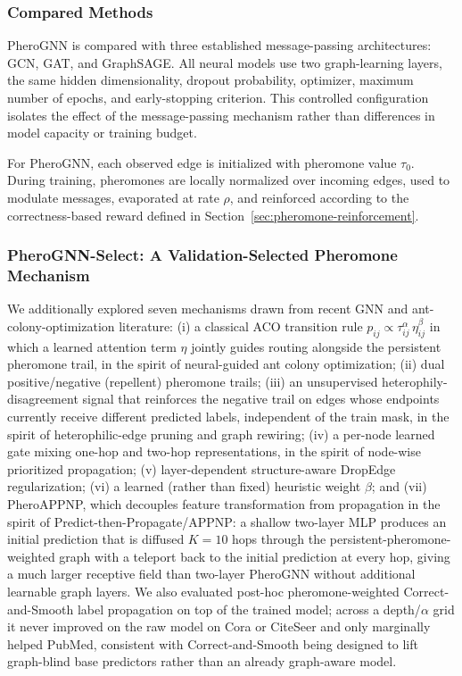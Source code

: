 \subsubsection{Compared Methods}

PheroGNN is compared with three established message-passing architectures: GCN, GAT, and GraphSAGE. All neural models use two graph-learning layers, the same hidden dimensionality, dropout probability, optimizer, maximum number of epochs, and early-stopping criterion. This controlled configuration isolates the effect of the message-passing mechanism rather than differences in model capacity or training budget.

For PheroGNN, each observed edge is initialized with pheromone value $\tau_0$. During training, pheromones are locally normalized over incoming edges, used to modulate messages, evaporated at rate $\rho$, and reinforced according to the correctness-based reward defined in Section~\ref{sec:pheromone-reinforcement}.

\subsubsection{PheroGNN-Select: A Validation-Selected Pheromone Mechanism}
\label{sec:pherognn-select}

We additionally explored seven mechanisms drawn from recent GNN and ant-colony-optimization literature: (i) a classical ACO transition rule $p_{ij} \propto \tau_{ij}^{\alpha}\,\eta_{ij}^{\beta}$ in which a learned attention term $\eta$ jointly guides routing alongside the persistent pheromone trail, in the spirit of neural-guided ant colony optimization; (ii) dual positive/negative (repellent) pheromone trails; (iii) an unsupervised heterophily-disagreement signal that reinforces the negative trail on edges whose endpoints currently receive different predicted labels, independent of the train mask, in the spirit of heterophilic-edge pruning and graph rewiring; (iv) a per-node learned gate mixing one-hop and two-hop representations, in the spirit of node-wise prioritized propagation; (v) layer-dependent structure-aware DropEdge regularization; (vi) a learned (rather than fixed) heuristic weight $\beta$; and (vii) PheroAPPNP, which decouples feature transformation from propagation in the spirit of Predict-then-Propagate/APPNP: a shallow two-layer MLP produces an initial prediction that is diffused $K=10$ hops through the persistent-pheromone-weighted graph with a teleport back to the initial prediction at every hop, giving a much larger receptive field than two-layer PheroGNN without additional learnable graph layers. We also evaluated post-hoc pheromone-weighted Correct-and-Smooth label propagation on top of the trained model; across a depth/$\alpha$ grid it never improved on the raw model on Cora or CiteSeer and only marginally helped PubMed, consistent with Correct-and-Smooth being designed to lift graph-blind base predictors rather than an already graph-aware model.

